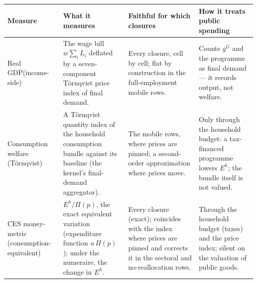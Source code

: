 \begin{table}[htbp]
\centering
\footnotesize
\setlength{\tabcolsep}{3pt}
\renewcommand{\arraystretch}{1.25}
\begin{tabular}{@{}>{\raggedright\arraybackslash}p{1.85cm}>{\raggedright\arraybackslash}p{3.9cm}>{\raggedright\arraybackslash}p{4.3cm}>{\raggedright\arraybackslash}p{4.3cm}@{}}
\toprule
\textbf{Measure} & \textbf{What it measures} & \textbf{Faithful for which closures} & \textbf{How it treats public spending} \\
\midrule
Real GDP\newline \scriptsize (income-side)
& The wage bill $w\sum_i L_i$ deflated by a seven-component T\"ornqvist price index of final demand.
& Every closure, cell by cell; flat by construction in the full-employment mobile rows.
& Counts $g^G$ and the programme as final demand --- it records output, not welfare. \\
Consumption welfare \newline \scriptsize (T\"ornqvist)
& A T\"ornqvist quantity index of the household consumption bundle against its baseline (the kernel's final-demand aggregator).
& The mobile rows, where prices are pinned; a second-order approximation where prices move.
& Only through the household budget: a tax-financed programme lowers $E^h$; the bundle itself is not valued. \\
CES money-metric \newline \scriptsize (consumption-equivalent)
& $E^h/\Pi(p)$, the exact equivalent variation (expenditure function $u\,\Pi(p)$); under the numeraire, the change in $E^h$.
& Every closure (exact); coincides with the index where prices are pinned and corrects it in the sectoral and no-reallocation rows.
& Through the household budget (taxes) and the price index; silent on the valuation of public goods. \\

\end{tabular}
\end{table}
